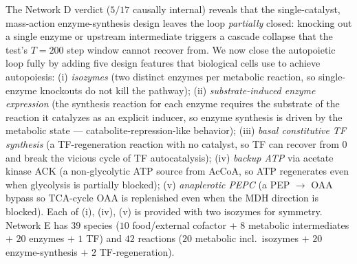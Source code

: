 \documentclass[11pt,a4paper]{article}
\theoremstyle{plain}
\theoremstyle{definition}
\theoremstyle{remark}
\begin{document}
The Network D verdict ($5/17$ causally internal) reveals that the
single-catalyst, mass-action enzyme-synthesis design leaves the loop
\emph{partially} closed: knocking out a single enzyme or upstream
intermediate triggers a cascade collapse that the test's $T = 200$ step
window cannot recover from. We now close the autopoietic loop fully
by adding five design features that biological cells use to achieve
autopoiesis: (i) \emph{isozymes} (two distinct enzymes per metabolic
reaction, so single-enzyme knockouts do not kill the pathway);
(ii) \emph{substrate-induced enzyme expression} (the synthesis
reaction for each enzyme requires the substrate of the reaction it
catalyzes as an explicit inducer, so enzyme synthesis is driven by the
metabolic state --- catabolite-repression-like behavior);
(iii) \emph{basal constitutive TF synthesis} (a TF-regeneration
reaction with no catalyst, so TF can recover from $0$ and break the
vicious cycle of TF autocatalysis); (iv) \emph{backup ATP} via acetate
kinase ACK (a non-glycolytic ATP source from AcCoA, so ATP regenerates
even when glycolysis is partially blocked); (v) \emph{anaplerotic
PEPC} (a PEP $\to$ OAA bypass so TCA-cycle OAA is replenished even
when the MDH direction is blocked). Each of (i), (iv), (v) is provided
with two isozymes for symmetry. Network E has $39$ species ($10$
food/external cofactor $+$ $8$ metabolic intermediates $+$ $20$ enzymes
$+$ $1$ TF) and $42$ reactions ($20$ metabolic incl.~isozymes $+$
$20$ enzyme-synthesis $+$ $2$ TF-regeneration).
\end{document}
